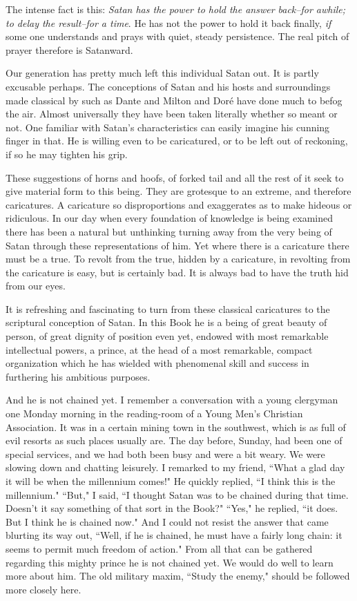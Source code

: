 The intense fact is this: \textit{Satan has the power to hold the answer
back--for awhile; to delay the result--for a time}. He has not the power
to hold it back finally, \textit{if} some one understands and prays with quiet,
steady persistence. The real pitch of prayer therefore is Satanward.

Our generation has pretty much left this individual Satan out. It is
partly excusable perhaps. The conceptions of Satan and his hosts and
surroundings made classical by such as Dante and Milton and Doré have
done much to befog the air. Almost universally they have been taken
literally whether so meant or not. One familiar with Satan's
characteristics can easily imagine his cunning finger in that. He is
willing even to be caricatured, or to be left out of reckoning, if so he
may tighten his grip.

These suggestions of horns and hoofs, of forked tail and all the rest of
it seek to give material form to this being. They are grotesque to an
extreme, and therefore caricatures. A caricature so disproportions and
exaggerates as to make hideous or ridiculous. In our day when every
foundation of knowledge is being examined there has been a natural but
unthinking turning away from the very being of Satan through these
representations of him. Yet where there is a caricature there must be a
true. To revolt from the true, hidden by a caricature, in revolting from
the caricature is easy, but is certainly bad. It is always bad to have the
truth hid from our eyes.

It is refreshing and fascinating to turn from these classical caricatures
to the scriptural conception of Satan. In this Book he is a being of great
beauty of person, of great dignity of position even yet, endowed with most
remarkable intellectual powers, a prince, at the head of a most
remarkable, compact organization which he has wielded with phenomenal
skill and success in furthering his ambitious purposes.

And he is not chained yet. I remember a conversation with a young
clergyman one Monday morning in the reading-room of a Young Men's
Christian Association. It was in a certain mining town in the southwest,
which is as full of evil resorts as such places usually are. The day
before, Sunday, had been one of special services, and we had both been
busy and were a bit weary. We were slowing down and chatting leisurely. I
remarked to my friend, ``What a glad day it will be when the millennium
comes!" He quickly replied, ``I think this is the millennium." ``But," I
said, ``I thought Satan was to be chained during that time. Doesn't it say
something of that sort in the Book?" ``Yes," he replied, ``it does. But I
think he is chained now." And I could not resist the answer that came
blurting its way out, ``Well, if he is chained, he must have a fairly long
chain: it seems to permit much freedom of action." From all that can be
gathered regarding this mighty prince he is not chained yet. We would do
well to learn more about him. The old military maxim, ``Study the enemy,"
should be followed more closely here.

